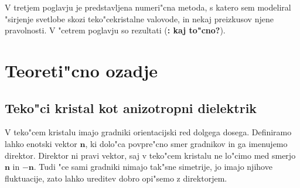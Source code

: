 \documentclass[a4paper,10pt]{article}
\newcommand{\todo}[1]{(\textbf{\textsmaller{TODO}: #1})}
\begin{document}
V tretjem poglavju je predstavljena numeri"cna metoda, s katero sem modeliral "sirjenje svetlobe skozi teko"cekristalne valovode, in nekaj preizkusov njene pravolnosti. 
V "cetrem poglavju so rezultati \todo{kaj to"cno?}. 

\section{Teoreti"cno ozadje}

\subsection{Teko"ci kristal kot anizotropni dielektrik}

V teko"cem kristalu imajo gradniki orientacijski red dolgega dosega. Definiramo lahko enotski vektor $\mathbf{n}$, ki dolo"ca povpre"cno smer gradnikov in ga imenujemo direktor. Direktor ni pravi vektor, saj v teko"cem kristalu ne lo"cimo med smerjo $\mathbf{n}$ in $\mathbf{-n}$. Tudi "ce sami gradniki nimajo tak"sne simetrije, jo imajo njihove fluktuacije, zato lahko ureditev dobro opi"semo z direktorjem\cite{mermin}. 

\end{document}
